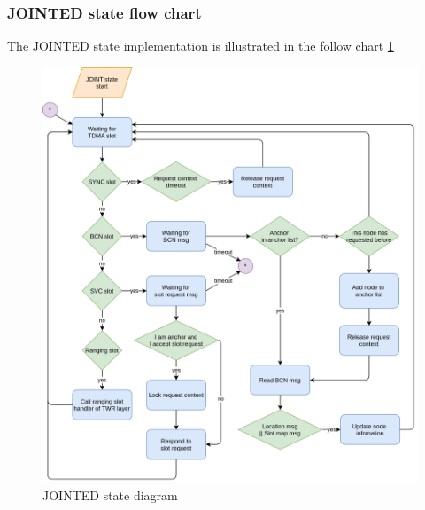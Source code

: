\documentclass[\main/main.tex]{subfiles}
\begin{document}
\subsubsection{JOINTED state flow chart}
The JOINTED state implementation is illustrated in the follow chart \ref{fig:JOINTED_state_diagram}
\begin{figure}[H]
    \begin{center}
        \includegraphics[scale=0.32]{JOINTED_state_flow_chart.png}
    \end{center}
    \caption{JOINTED state diagram}
    \label{fig:JOINTED_state_diagram}
\end{figure}
\end{document}
